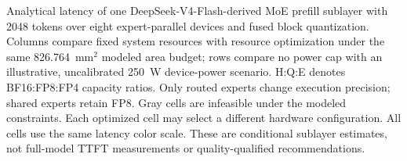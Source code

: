 \caption{Analytical latency of one DeepSeek-V4-Flash-derived MoE prefill
sublayer with 2048 tokens over eight expert-parallel devices and fused
block quantization. Columns compare fixed system resources with resource
optimization under the same 826.764~mm$^2$ modeled area budget; rows compare
no power cap with an illustrative, uncalibrated 250~W device-power scenario.
H:Q:E denotes BF16:FP8:FP4 capacity ratios. Only routed experts change
execution precision; shared experts retain FP8. Gray cells are infeasible
under the modeled constraints. Each optimized cell may select a different
hardware configuration. All cells use the same latency color scale.
These are conditional sublayer estimates, not full-model TTFT measurements
or quality-qualified recommendations.}
\label{fig:llmcompass-moe-ratio-system}
